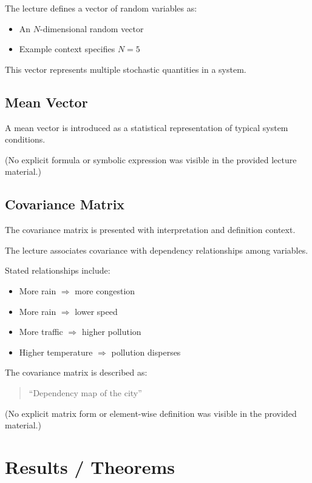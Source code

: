 \documentclass[12pt]{article}
\begin{document}
The lecture defines a vector of random variables as:

\begin{itemize}
\item An \( N \)-dimensional random vector
\item Example context specifies \( N = 5 \)
\end{itemize}

This vector represents multiple stochastic quantities in a system.

\subsection*{Mean Vector}

A mean vector is introduced as a statistical representation of typical system conditions.

(No explicit formula or symbolic expression was visible in the provided lecture material.)

\subsection*{Covariance Matrix}

The covariance matrix is presented with interpretation and definition context.

The lecture associates covariance with dependency relationships among variables.

Stated relationships include:

\begin{itemize}
\item More rain $\Rightarrow$ more congestion
\item More rain $\Rightarrow$ lower speed
\item More traffic $\Rightarrow$ higher pollution
\item Higher temperature $\Rightarrow$ pollution disperses
\end{itemize}

The covariance matrix is described as:

\begin{quote}
``Dependency map of the city''
\end{quote}

(No explicit matrix form or element-wise definition was visible in the provided material.)

\section*{Results / Theorems}
\end{document}
